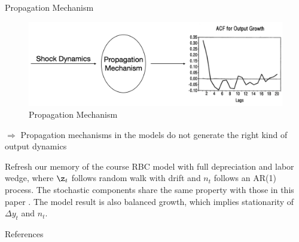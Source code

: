 \documentclass[10pt]{beamer}
\begin{document}
\begin{frame}{Propagation Mechanism}
    \begin{figure}
        \centering
        \includegraphics[width=\linewidth]{figures/propagation.png}
        \caption{Propagation Mechanism}
    \end{figure}

    $\Rightarrow$ Propagation mechanisms in the models do not generate the right kind of output dynamics
\end{frame}

\begin{frame}{Refresh our memory of the course}
    RBC model with full depreciation and labor wedge, where $\z_t$ follows random walk with drift and $n_t$ follows an AR(1) process. The stochastic components share the same property with those in this paper \cite{cogley_nason_1995}.
    The model result is also balanced growth, which implies stationarity of $\Delta y_t$ and $n_t$.
\end{frame}

\begin{frame}[allowframebreaks]{References}

    
    

\end{frame}
\end{document}
